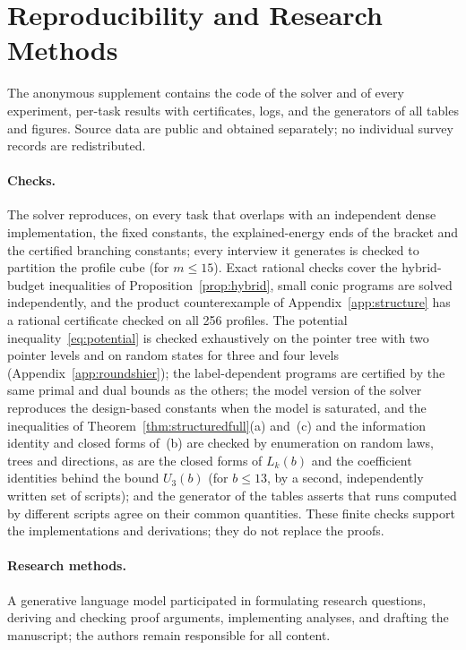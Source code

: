 \section{Reproducibility and Research Methods}\label{app:repro}
The anonymous supplement contains the code of the solver and of every experiment, per-task results with certificates, logs, and the generators of all tables and figures. Source data are public and obtained separately; no individual survey records are redistributed.

\paragraph{Checks.}
The solver reproduces, on every task that overlaps with an independent dense implementation, the fixed constants, the explained-energy ends of the bracket and the certified branching constants; every interview it generates is checked to partition the profile cube (for $m\le15$). Exact rational checks cover the hybrid-budget inequalities of Proposition~\ref{prop:hybrid}, small conic programs are solved independently, and the product counterexample of Appendix~\ref{app:structure} has a rational certificate checked on all 256 profiles. The potential inequality~\eqref{eq:potential} is checked exhaustively on the pointer tree with two pointer levels and on random states for three and four levels (Appendix~\ref{app:roundshier}); the label-dependent programs are certified by the same primal and dual bounds as the others; the model version of the solver reproduces the design-based constants when the model is saturated, and the inequalities of Theorem~\ref{thm:structuredfull}(a) and~(c) and the information identity and closed forms of~(b) are checked by enumeration on random laws, trees and directions, as are the closed forms of $L_k(b)$ and the coefficient identities behind the bound $U_3(b)$ (for $b\le13$, by a second, independently written set of scripts); and the generator of the tables asserts that runs computed by different scripts agree on their common quantities. These finite checks support the implementations and derivations; they do not replace the proofs.

\paragraph{Research methods.}
A generative language model participated in formulating research questions, deriving and checking proof arguments, implementing analyses, and drafting the manuscript; the authors remain responsible for all content.
